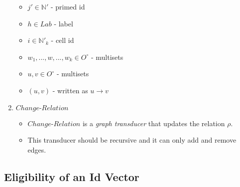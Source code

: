 \documentclass{article}
\newcommand{\mn}{\text{-}}
\begin{document}
\begin{enumerate}
\begin{figure}[H]
\begin{center}
\begin{tikzpicture}
\end{tikzpicture}
\end{center}
\end{figure}

\begin{itemize}
\item $j' \in \mathbb{N}'$ - primed id
\item $h \in Lab$ - label
\item $i \in \mathbb{N}'_k$ - cell id 
\item $w_1,...,w,...,w_k \in O^{\circ}$ - multisets
\item $u,v \in O^{\circ}$ - multisets
\item $(u,v)$ - written as $u \rightarrow v$
\end{itemize}


\item $Change\mn Relation$
\begin{itemize}
\item $Change\mn Relation$ is a \textit{graph transducer} that updates the relation $\rho$.
\item This transducer should be recursive and it can only add and remove edges.
\end{itemize}


\end{enumerate}


\subsection{Eligibility of an Id Vector}

\end{document}
